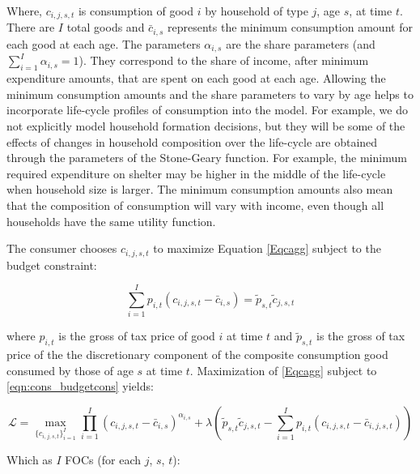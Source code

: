 Where, $c_{i,j,s,t}$ is consumption of good $i$ by household of type $j$, age $s$, at time $t$.  There are $I$ total goods and $\bar{c}_{i,s}$ represents the minimum consumption amount for each good at each age.  The parameters $\alpha_{i,s}$ are the share parameters (and $\sum_{i=1}^{I} \alpha_{i,s}=1$).  They correspond to the share of income, after minimum expenditure amounts, that are spent on each good at each age.  Allowing the minimum consumption amounts and the share parameters to vary by age helps to incorporate life-cycle profiles of consumption into the model.  For example, we do not explicitly model household formation decisions, but they will be some of the effects of changes in household composition over the life-cycle are obtained through the parameters of the Stone-Geary function.  For example, the minimum required expenditure on shelter may be higher in the middle of the life-cycle when household size is larger.  The minimum consumption amounts also mean that the composition of consumption will vary with income, even though all households have the same utility function.

The consumer chooses $c_{i,j,s,t}$ to maximize Equation \ref{Eqcagg} subject to the budget constraint:

    \begin{equation} \label{eqn:cons_budgetcons}
        \sum_{i=1}^{I} p_{i,t}(c_{i,j,s,t}-\bar{c}_{i,s})  = \tilde{p}_{s,t}\tilde{c}_{j,s,t}
    \end{equation}

\noindent where $p_{i,t}$ is the gross of tax price of good $i$ at time $t$ and $\tilde{p}_{s,t}$ is the gross of tax price of the the discretionary component of the composite consumption good consumed by those of age $s$ at time $t$.  Maximization of \ref{Eqcagg} subject to \ref{eqn:cons_budgetcons} yields:

    \begin{equation} \label{eqn:cons_lagrangian}
       \mathcal{L} =  \max_{\{c_{i,j,s,t}\}_{i=1}^{I}}  \prod_{i=1}^I \left( c_{i,j,s,t} - \bar c_{i,s} \right) ^{\alpha_{i,s}}  + \lambda \left(\tilde{p}_{s,t}\tilde{c}_{j,s,t} - \sum_{i=1}^{I} p_{i,t}(c_{i,j,s,t}-\bar{c}_{i,j,s,t})\right)
    \end{equation}
    
    Which as $I$ FOCs (for each $j$, $s$, $t$):
    
